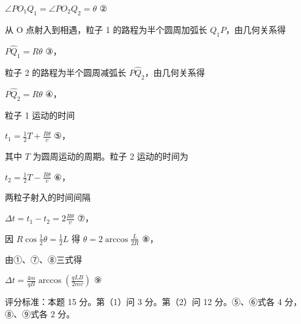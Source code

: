\documentclass[\gkver]{gaokaozhenti}
\begin{document}
\begin{enumerate}
{$\angle PO_1Q_1 = \angle PO_2Q_2 = \theta$ ②

从 O 点射入到相遇，粒子 1 的路程为半个圆周加弧长 $Q_1P$，由几何关系得

$P\hat{Q}_1 = R\theta$ ③，

粒子 2 的路程为半个圆周减弧长 $P\hat{Q}_2$，由几何关系得

$P\hat{Q}_2 = R\theta$ ④，

粒子 1 运动的时间

$t_1 = \frac{1}{2}T + \frac{R\theta}{v}$ ⑤，

其中 $T$ 为圆周运动的周期。粒子 2 运动的时间为

$t_2 = \frac{1}{2}T - \frac{R\theta}{v}$ ⑥，

两粒子射入的时间间隔

$\Delta t = t_1 - t_2 = 2\frac{R\theta}{v}$ ⑦，

因 $R\cos\frac{1}{2}\theta = \frac{1}{2}L$ 得 $\theta = 2\arccos\frac{L}{2R}$ ⑧，

由①、⑦、⑧三式得

$\Delta t = \frac{4m}{qB}\arccos\left(\frac{qLB}{2mv}\right)$ ⑨


评分标准：本题 15 分。第（1）问 3 分。第（2）问 12 分。⑤、⑥式各 4 分，⑧、⑨式各 2 分。
}

\end{enumerate}
\end{document}
